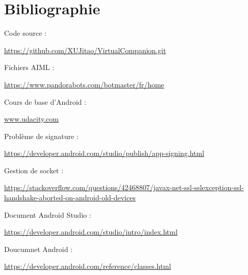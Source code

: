 \section*{Bibliographie}

Code source : \begin{scriptsize}\url{https://github.com/XUJitao/VirtualCompanion.git}\end{scriptsize}

Fichiers AIML : \begin{scriptsize}\url{https://www.pandorabots.com/botmaster/fr/home}\end{scriptsize}

Cours de base d'Android : \begin{scriptsize}\url{www.udacity.com}\end{scriptsize}

Problème de signature : \begin{scriptsize}\url{https://developer.android.com/studio/publish/app-signing.html}\end{scriptsize}

Gestion de socket : \begin{tiny}\url{https://stackoverflow.com/questions/42468807/javax-net-ssl-sslexception-ssl-handshake-aborted-on-android-old-devices}\end{tiny}

Document Android Studio : \begin{scriptsize}\url{https://developer.android.com/studio/intro/index.html}\end{scriptsize}

Doucumnet Android : \begin{scriptsize}\url{https://developer.android.com/reference/classes.html}\end{scriptsize}

\newpage


